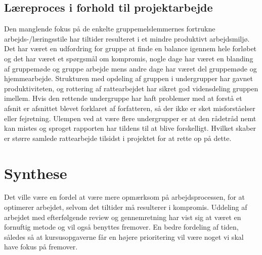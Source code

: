\subsection{Læreproces i forhold til projektarbejde}
Den manglende fokus på de enkelte gruppemelslemmernes fortrukne arbejds-/læringsstile har tiltider resulteret i et mindre produktivt arbejdsmiljø. Det har været en udfordring for gruppe at finde en balance igennem hele forløbet og det har været et spørgsmål om kompromis, nogle dage har været en blanding af gruppemøde og gruppe arbejde mens andre dage har været del gruppemøde og hjemmearbejde. Strukturen med opdeling af gruppen i undergrupper har gavnet produktiviteten, og rottering af rattearbejdet har sikret god vidensdeling gruppen imellem. Hvis den rettende undergruppe har haft problemer med at forstå et afsnit er afsnittet blevet forklaret af forfatteren, så der ikke er sket misforståelser eller fejretning. Ulempen ved at være flere undergrupper er at den rådetråd nemt kan mistes og sproget rapporten har tildens til at blive forskelligt. Hvilket skaber er større samlede rattearbejde tilsidst i projektet for at rette op på dette. 
\section{Synthese}
Det ville være en fordel at være mere opmærksom på arbejdsprocessen, for at optimerer arbejdet, selvom det tiltider må resulterer i kompromis. Uddeling af arbejdet med efterfølgende review og gennemretning har vist sig at været en fornuftig metode og vil også benyttes fremover. En bedre fordeling af tiden, således så at kursusopgaverne får en højere prioritering vil være noget vi skal have fokus på fremover.